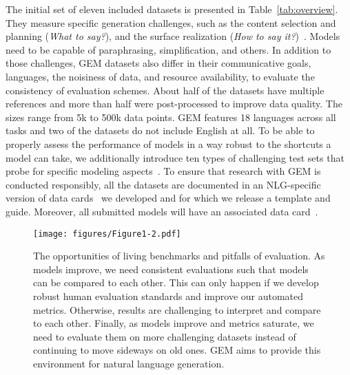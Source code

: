 \documentclass[11pt,a4paper]{article}
\newcommand{\GEM}{\textsc{GEM}}
\begin{document}
The initial set of eleven included datasets is presented in Table~\ref{tab:overview}. They measure specific generation challenges, such as the content selection and planning  (\textit{What to say?}), and the surface realization (\textit{How to say it?})~\citep{reiter2000building,gatt2018survey}. Models need to be capable of paraphrasing, simplification, and others. In addition to those challenges, \GEM{} datasets also differ in their communicative goals, languages, the noisiness of data, and resource availability, to evaluate the consistency of evaluation schemes.
About half of the datasets have multiple references and more than half were post-processed to improve data quality. The sizes range from 5k to 500k data points. \GEM{} features 18 languages across all tasks and two of the datasets do not include English at all.
To be able to properly assess the performance of models in a way robust to the shortcuts a model can take, we additionally introduce ten types of challenging test sets that probe for specific modeling aspects~\citep{perez2017analysing,ribeiro-etal-2020-beyond}. 
To ensure that research with \GEM{} is conducted responsibly, all the datasets are documented in an NLG-specific version of data cards~\citep{bender2018data,gebru2018datasheets} we developed and for which we release a template and guide. Moreover, all submitted models will have an associated data card~\citep{mitchell2019model}.


\begin{figure}[t]
\centering
\texttt{[image: figures/Figure1-2.pdf]}
\caption[The circle of model development]{The opportunities of living benchmarks and pitfalls of evaluation. As models improve, we need consistent evaluations such that models can be compared to each other. This can only happen if we develop robust human evaluation standards and improve our automated metrics. Otherwise, results are challenging to interpret and compare to each other. Finally, as models improve and metrics saturate, we need to evaluate them on more challenging datasets instead of continuing to move sideways on old ones. \GEM{} aims to provide this environment for natural language generation.}
\label{fig:circle}
\end{figure}
\end{document}

